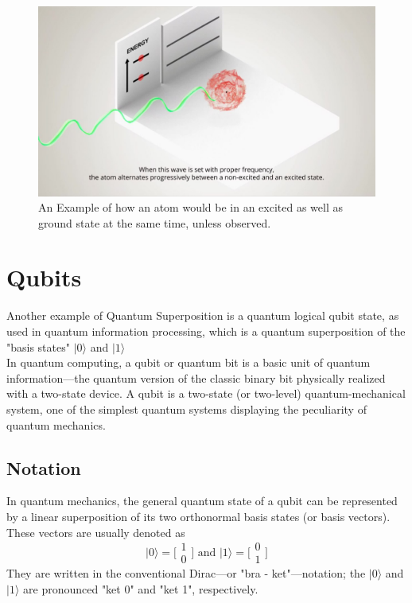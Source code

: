 \documentclass[11pt]{article}
\begin{document}
\begin{figure}
	\centering
	\includegraphics[scale = 0.3]{superposition.jpg}
	\caption{An Example of how an atom would be in an excited as well as ground state at the same time, unless observed. }
\end{figure}


\section{Qubits}

Another example of Quantum Superposition is a quantum logical qubit state, as used in quantum information processing, which is a quantum superposition of the "basis states" $ {\displaystyle |0\rangle } $ and $ {\displaystyle |1\rangle } $  \\


In quantum computing, a qubit or quantum bit is a basic unit of quantum information—the quantum version of the classic binary bit physically realized with a two-state device. A qubit is a two-state (or two-level) quantum-mechanical system, one of the simplest quantum systems displaying the peculiarity of quantum mechanics. \\

 
\subsection{Notation}
In quantum mechanics, the general quantum state of a qubit can be represented by a linear superposition of its two orthonormal basis states (or basis vectors). These vectors are usually denoted as $${\displaystyle |0\rangle ={\bigl [}{\begin{smallmatrix}1\\0\end{smallmatrix}}{\bigr ]}} \text{ and } {\displaystyle |1\rangle ={\bigl [}{\begin{smallmatrix}0\\1\end{smallmatrix}}{\bigr ]}}$$They are written in the conventional Dirac—or "bra - ket"—notation; the ${\displaystyle |0\rangle }$  and ${\displaystyle |1\rangle }$ are pronounced "ket 0" and "ket 1", respectively.
\end{document}

